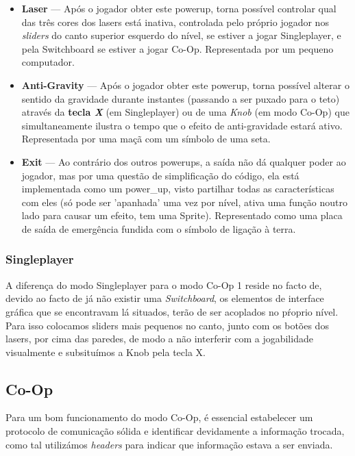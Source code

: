 \documentclass{report}
\begin{document}
\begin{itemize}
	\item \textbf{Laser} --- Após o jogador obter este powerup, torna possível controlar qual das três cores dos lasers está inativa, controlada pelo próprio jogador nos \textit{sliders} do canto superior esquerdo do nível, se estiver a jogar Singleplayer, e pela Switchboard se estiver a jogar Co-Op. Representada por um pequeno computador.

	\item \textbf{Anti-Gravity} --- Após o jogador obter este powerup, torna possível alterar o sentido da gravidade durante instantes (passando a ser puxado para o teto) através da \textbf{tecla \textit{X}} (em Singleplayer) ou de uma \textit{Knob}  (em  modo Co-Op) que simultaneamente ilustra o tempo que o efeito de anti-gravidade estará ativo. Representada por uma maçã com um símbolo de uma seta.

	\item \textbf{Exit} --- Ao contrário dos outros powerups, a saída não dá qualquer poder ao jogador, mas por uma questão de simplificação do código, ela está implementada como um power\_up, visto partilhar todas as características com eles (só pode ser 'apanhada' uma vez por nível, ativa uma função noutro lado para causar um efeito, tem uma Sprite). Representado como uma placa de saída de emergência fundida com o símbolo de ligação à terra.
\end{itemize}

\subsubsection{Singleplayer}

A diferença do modo Singleplayer para o modo Co-Op 1 reside no facto de, devido ao facto de já não existir uma \textit{Switchboard}, os elementos de interface gráfica que se encontravam lá situados, terão de ser acoplados no pŕoprio nível. Para isso colocamos sliders mais pequenos no canto, junto com os botões dos lasers, por cima das paredes, de modo a não interferir com a jogabilidade visualmente e subsituímos a Knob pela tecla X.

\subsection{Co-Op}
Para um bom funcionamento do modo Co-Op, é essencial estabelecer um protocolo de comunicação sólida e identificar devidamente a informação trocada, como tal utilizámos \textit{headers} para indicar que informação estava a ser enviada.
\end{document}
